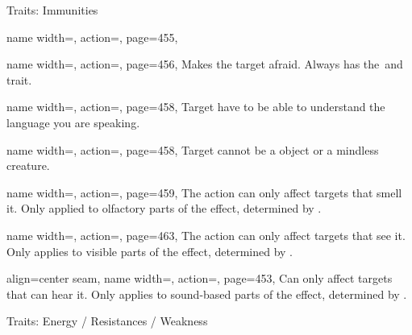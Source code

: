 \begin{PageFront}
\begin{Tables}{\frontTableHeight}
\begin{Table}{Traits: Immunities}
\begin{entry}{}{%
                name width=\conditionLength,%
                action=\Emotion,
                page=455,
            }
            \end{entry}
            \begin{entry}{}{%
                name width=\conditionLength,%
                action=\Fear,
                page=456,
            }
                Makes the target afraid. Always has the \Mental\,and \Emotion\,trait.
            \end{entry}
            \begin{entry}{}{%
                name width=\conditionLength,%
                action=\Linguistic,
                page=458,
            }
                Target have to be able to understand the language you are speaking.
            \end{entry}
            \begin{entry}{}{%
                name width=\conditionLength,%
                action=\Mental,
                page=458,
            }
                Target cannot be a object or a mindless creature.
            \end{entry}
            \begin{entry}{}{%
                name width=\conditionLength,%
                action=\Olfactory,
                page=459,
            }
                The action can only affect targets that smell it. \hfill
                Only applied to olfactory parts of the effect, determined by \GM.
            \end{entry}
            \begin{entry}{}{%
                name width=\conditionLength,%
                action=\Visual,
                page=463,
            }
                The action can only affect targets that see it.\hfill
                Only applies to visible parts of the effect, determined by \GM.
            \end{entry}
            \begin{entry}{}{%
                align=center seam,
                name width=\conditionLength,%
                action=\Auditory,
                page=453,
            }
                Can only affect targets that can hear it. \hfill
                Only applies to sound-based parts of the effect, determined by \GM.\\
            \end{entry}
        \end{Table}
        \TableSpace
        \begin{Table}{Traits: Energy / Resistances / Weakness}

\end{Table}
\end{Tables}
\end{PageFront}
